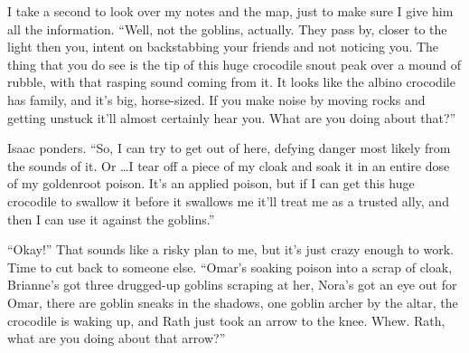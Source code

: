 I take a second to look over my notes and the map, just to make sure I give him all the information. ``Well, not the goblins, actually. They pass by, closer to the light then you, intent on backstabbing your friends and not noticing you. The thing that you do see is the tip of this huge crocodile snout peak over a mound of rubble, with that rasping sound coming from it. It looks like the albino crocodile has family, and it's big, horse-sized. If you make noise by moving rocks and getting unstuck it'll almost certainly hear you. What are you doing about that?''

Isaac ponders. ``So, I can try to get out of here, defying danger most likely from the sounds of it. Or \ldots  I tear off a piece of my cloak and soak it in an entire dose of my goldenroot poison. It's an applied poison, but if I can get this huge crocodile to swallow it before it swallows me it'll treat me as a trusted ally, and then I can use it against the goblins.''

``Okay!'' That sounds like a risky plan to me, but it's just crazy enough to work. Time to cut back to someone else. ``Omar's soaking poison into a scrap of cloak, Brianne's got three drugged-up goblins scraping at her, Nora's got an eye out for Omar, there are goblin sneaks in the shadows, one goblin archer by the altar, the crocodile is waking up, and Rath just took an arrow to the knee. Whew. Rath, what are you doing about that arrow?''


